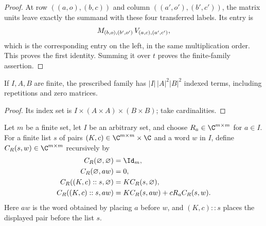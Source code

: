 \begin{proof}\leanok
    At row $((a,o),(b,c))$ and column $((a',o'),(b',c'))$, the matrix
    units leave exactly the summand with these four transferred labels.
    Its entry is
    \begin{align}
        M_{(b,o),(b',o')}\,V_{(a,c),(a',c')},\notag
    \end{align}
    which is the corresponding entry on the left, in the same
    multiplication order. This proves the first identity. Summing it over
    $t$ proves the finite-family assertion.
\end{proof}

\begin{lemma}
    \label{thm:chain_middle_factor_exchange_card}
    \leanok
    If $I,A,B$ are finite, the prescribed family has $|I|\,|A|^2|B|^2$ indexed
    terms, including repetitions and zero matrices.
\end{lemma}

\begin{proof}\leanok
    Its index set is $I\times(A\times A)\times(B\times B)$; take cardinalities.
\end{proof}

\begin{definition}
    \label{def:core_word_coefficients}
    \leanok
    Let $m$ be a finite set, let $I$ be an arbitrary set, and choose
    $R_a\in\C^{m\times m}$ for $a\in I$. For a finite list $s$ of pairs
    $(K,c)\in\C^{m\times m}\times\C$ and a word $w$ in $I$, define
    $C_R(s,w)\in\C^{m\times m}$ recursively by
    \begin{align}
        C_R(\varnothing,\varnothing) & =\Id_m,\notag                \\
        C_R(\varnothing,aw)          & =0,\notag                    \\
        C_R((K,c)::s,\varnothing)    & =K C_R(s,\varnothing),\notag \\
        C_R((K,c)::s,aw)             & =K C_R(s,aw)+cR_a C_R(s,w).
        \label{eq:core_word_recursion}
    \end{align}
    Here $aw$ is the word obtained by placing $a$ before $w$, and $(K,c)::s$
    places the displayed pair before the list $s$.
\end{definition}

